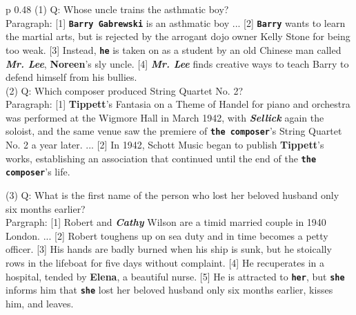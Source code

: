 \documentclass[11pt,a4paper]{article}
\begin{document}
\begin{table}[!t]
    \begin{center}
\begin{tabular}{p {0.48\textwidth}}
    \toprule
(1) Q: Whose uncle trains the asthmatic boy? \\    
Paragraph: {\color{olive} [1]} {\color{rel} \bf \texttt{Barry Gabrewski}} is an asthmatic boy ... {\color{olive} [2]} {\color{rel} \bf \texttt{Barry}} wants to learn the martial arts, but is rejected by the arrogant dojo owner Kelly Stone for being too weak. {\color{olive} [3]}
Instead, {\color{rel} \bf \texttt{he}} is taken on as a student by an old Chinese man called {\color{blue}\bf \textit{Mr. Lee}}, {\color{red} \bf Noreen}'s sly uncle. {\color{olive} [4]}  {\color{blue}\bf \textit{Mr. Lee}}  finds creative ways to teach Barry to defend himself from his bullies.  \\
\midrule
(2) Q: Which composer produced String Quartet No. 2? \\
Paragraph: {\color{olive} [1]} {\color{red} \bf Tippett}'s Fantasia on a Theme of Handel for piano and orchestra was performed at the Wigmore Hall in March 1942, with {\color{blue}\bf \textit{Sellick}} again the soloist, and the same venue saw the premiere of {\color{rel} \bf \texttt{the composer}}'s String Quartet No. 2 a year later.  ...  {\color{olive} [2]} In 1942, Schott Music began to publish {\color{red} \bf Tippett}'s works, establishing an association that continued until the end of the {\color{rel} \bf \texttt{the composer}}'s life. \\


\midrule


(3) Q: What is the first name of the person who lost her beloved husband only six months earlier? \\
Pargraph: {\color{olive} [1]} Robert and {\color{blue}\bf \textit{Cathy}} Wilson are a timid married couple in 1940 London.  ...  {\color{olive} [2]} Robert toughens up on sea duty and in time becomes a petty officer.  {\color{olive} [3]} His hands are badly burned when his ship is sunk, but he stoically rows in the lifeboat for five days without complaint. {\color{olive} [4]} He recuperates in a hospital, tended by {\color{red} \bf Elena}, a beautiful nurse.  {\color{olive} [5]} He is attracted to {\color{rel} \bf \texttt{her}}, but {\color{rel} \bf \texttt{she}} informs him that {\color{rel} \bf \texttt{she}} lost her beloved husband only six months earlier, kisses him, and leaves. \\


\end{tabular}
\end{center}
\end{table}
\end{document}
